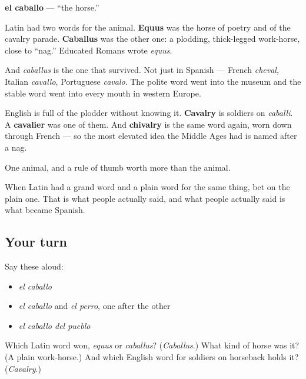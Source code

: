 \begin{cousinweb}
\textbf{el caballo} — \textquotedblleft{}the horse.\textquotedblright{}

Latin had two words for the animal. \textbf{Equus} was the horse of poetry and of the cavalry parade. \textbf{Caballus} was the other one: a plodding, thick-legged work-horse, close to \textquotedblleft{}nag.\textquotedblright{} Educated Romans wrote \emph{equus}.

And \emph{caballus} is the one that survived. Not just in Spanish — French \emph{cheval}, Italian \emph{cavallo}, Portuguese \emph{cavalo}. The polite word went into the museum and the stable word went into every mouth in western Europe.

English is full of the plodder without knowing it. \textbf{Cavalry} is soldiers on \emph{caballi}. A \textbf{cavalier} was one of them. And \textbf{chivalry} is the same word again, worn down through French — so the most elevated idea the Middle Ages had is named after a nag.
\end{cousinweb}

\begin{grammarlens}[title={What you've built}]
One animal, and a rule of thumb worth more than the animal.

When Latin had a grand word and a plain word for the same thing, bet on the plain one. That is what people actually said, and what people actually said is what became Spanish.
\end{grammarlens}

\subsection*{Your turn}
Say these aloud:

\begin{itemize}
\raggedright
  \item \emph{el caballo}
  \item \emph{el caballo} and \emph{el perro}, one after the other
  \item \emph{el caballo del pueblo}
\end{itemize}

\begin{tcolorbox}[breakable,colback=teal!4,colframe=teal!35!black,title={Before you move on}]
Which Latin word won, \emph{equus} or \emph{caballus}? (\emph{Caballus}.) What kind of horse was it? (A plain work-horse.) And which English word for soldiers on horseback holds it? (\emph{Cavalry}.)
\end{tcolorbox}
